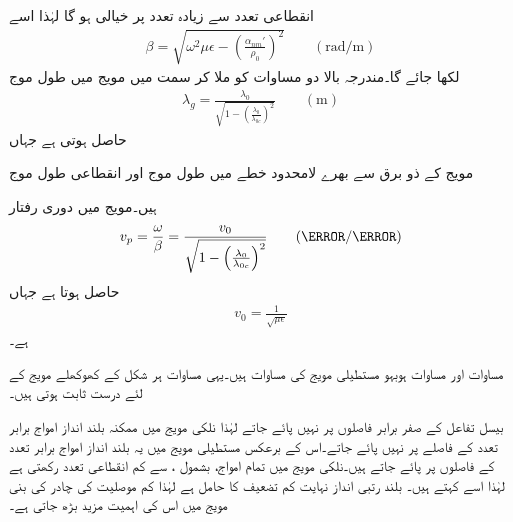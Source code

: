 انقطاعی تعدد سے زیادہ تعدد پر  خیالی ہو گا لہٰذا اسے
\begin{align}
\beta=\sqrt{\omega^2 \mu\epsilon-\left(\frac{\alpha_{nm}'}{\rho_0}\right)^2} \quad \quad (\si{\radian/\meter})
\end{align}
لکھا جائے گا۔مندرجہ بالا دو مساوات کو ملا کر  سمت میں مویج میں طول موج
\begin{align}\label{مساوات_مویج_نلکی_طول_موج}
\lambda_g=\frac{\lambda_0}{\sqrt{1-\left(\frac{\lambda_0}{\lambda_{0c}}\right)^2}} \quad \quad (\si{\meter})
\end{align}
حاصل ہوتی ہے جہاں
\begin{description}
 مویج کے ذو برق سے بھرے لامحدود خطے میں طول موج اور
 انقطاعی طول موج
\end{description}
ہیں۔مویج میں دوری رفتار 
\begin{align}\label{مساوات_مویج_نلکی_دوری_رفتار}
v_p=\frac{\omega}{\beta}=\frac{v_0}{\sqrt{1-\left(\frac{\lambda_0}{\lambda_{0c}}\right)^2}} \quad \quad (\meter / \second)
\end{align}
حاصل ہوتا ہے جہاں
\begin{align*}
v_0=\frac{1}{\sqrt{\mu \epsilon}}
\end{align*}
ہے۔

مساوات  اور مساوات  ہوبہو مستطیلی مویج کی مساوات ہیں۔یہی مساوات ہر شکل کے کھوکھلے مویج کے لئے درست ثابت ہوتی ہیں۔ 

بیسل تفاعل کے صفر برابر فاصلوں پر نہیں پائے جاتے لہٰذا نلکی مویج میں ممکنہ بلند انداز امواج برابر تعدد کے فاصلے پر نہیں پائے جاتے۔اس کے برعکس مستطیلی مویج میں یہ بلند انداز امواج برابر تعدد کے فاصلوں پر پائے جاتے ہیں۔نلکی مویج میں  تمام امواج، بشمول ، سے کم انقطاعی تعدد رکھتی ہے لہٰذا اسے   کہتے ہیں۔ بلند رتبی انداز نہایت کم  تضعیف کا حامل ہے لہٰذا کم موصلیت کی چادر کی بنی مویج میں اس کی اہمیت مزید بڑھ جاتی ہے۔

